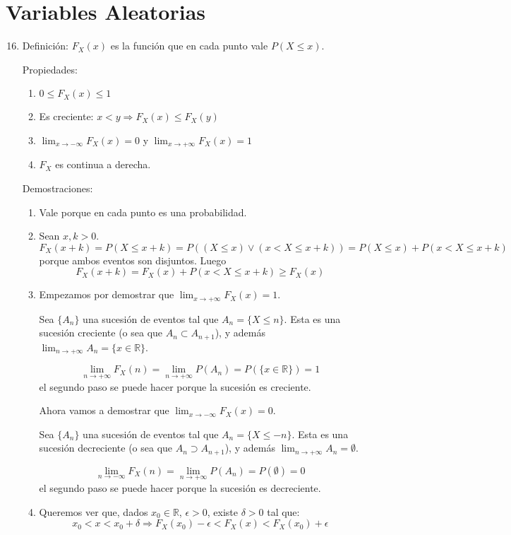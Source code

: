 \section{Variables Aleatorias}
\begin{enumerate}
	\setcounter{enumi}{15}
	\item
		Definición: $F_X(x)$ es la función que en cada punto vale $P(X\leq x)$.
		
		Propiedades:
			\begin{enumerate}
				\item $0 \leq F_X(x) \leq 1$
				\item Es creciente: $x< y \Rightarrow F_X(x) \leq F_X(y)$
				\item $\lim_{x\rightarrow -\infty}F_X(x) = 0$ y $\lim_{x\rightarrow +\infty}F_X(x) = 1$
				\item $F_X$ es continua a derecha.
			\end{enumerate}
			
		Demostraciones:
			\begin{enumerate}
				\item Vale porque en cada punto es una probabilidad.
				\item
					Sean $x,k > 0$. $$F_X(x+k) = P(X\leq x+k) = P((X\leq x) \lor (x<X\leq x+k)) = P(X\leq x) + P(x<X\leq x+k)$$
					porque ambos eventos son disjuntos. Luego $$F_X(x+k) = F_X(x) + P(x<X\leq x+k) \geq F_X(x)$$
				\item
					Empezamos por demostrar que $\lim_{x \rightarrow +\infty}F_X(x) = 1$.
					
					Sea $\{A_n\}$ una sucesión de eventos tal que $A_n = \{X\leq n\}$.
					Esta es una sucesión creciente (o sea que $A_n \subset A_{n+1}$), y además $\lim_{n\rightarrow +\infty}A_n = \{x \in\mathbb{R}\}$.
					
					$$\lim_{n\rightarrow +\infty}F_X(n) = \lim_{n\rightarrow +\infty}P(A_n) = P(\{x\in\mathbb{R}\}) = 1$$
					el segundo paso se puede hacer porque la sucesión es creciente.
					
					Ahora vamos a demostrar que $\lim_{x \rightarrow -\infty}F_X(x) = 0$.
					
					Sea $\{A_n\}$ una sucesión de eventos tal que $A_n = \{X\leq -n\}$.
					Esta es una sucesión decreciente (o sea que $A_n \supset A_{n+1}$), y además $\lim_{n\rightarrow +\infty}A_n = \emptyset $.
					
					$$\lim_{n\rightarrow -\infty}F_X(n) = \lim_{n\rightarrow +\infty}P(A_n) = P(\emptyset) = 0$$
					el segundo paso se puede hacer porque la sucesión es decreciente.
				\item
					Queremos ver que, dados $x_0\in\mathbb{R}$, $\epsilon > 0$, existe $\delta > 0$ tal que:
					$$x_0 < x < x_0 + \delta \Rightarrow F_X(x_0) - \epsilon < F_X(x) < F_X(x_0) + \epsilon$$
					

\end{enumerate}
\end{enumerate}
